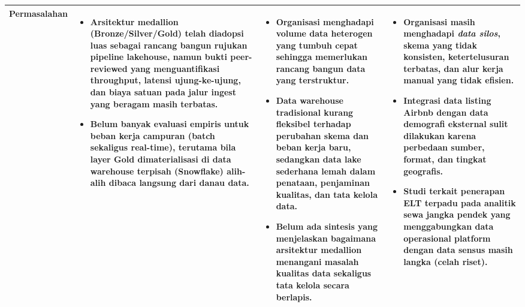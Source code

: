 \documentclass[11pt,a4paper]{article}
\newenvironment{cellitems}
  {\vspace{-2pt}\begin{itemize}\setlength{\itemsep}{1.5pt}\setlength{\parskip}{0pt}\setlength{\topsep}{1pt}}
  {\end{itemize}\vspace{-2pt}}
\begin{document}
\begin{longtable}{|L{2.5cm}|L{7.65cm}|L{7.65cm}|L{7.65cm}|}
\textbf{Permasalahan} &
\begin{cellitems}
  \item Arsitektur medallion (Bronze/Silver/Gold) telah diadopsi luas sebagai rancang bangun rujukan pipeline lakehouse, namun bukti peer-reviewed yang menguantifikasi throughput, latensi ujung-ke-ujung, dan biaya satuan pada jalur ingest yang beragam masih terbatas.
  \item Belum banyak evaluasi empiris untuk beban kerja campuran (batch sekaligus real-time), terutama bila layer Gold dimaterialisasi di data warehouse terpisah (Snowflake) alih-alih dibaca langsung dari danau data.
\end{cellitems} &
\begin{cellitems}
  \item Organisasi menghadapi volume data heterogen yang tumbuh cepat sehingga memerlukan rancang bangun data yang terstruktur.
  \item Data warehouse tradisional kurang fleksibel terhadap perubahan skema dan beban kerja baru, sedangkan data lake sederhana lemah dalam penataan, penjaminan kualitas, dan tata kelola data.
  \item Belum ada sintesis yang menjelaskan bagaimana arsitektur medallion menangani masalah kualitas data sekaligus tata kelola secara berlapis.
\end{cellitems} &
\begin{cellitems}
  \item Organisasi masih menghadapi \textit{data silos}, skema yang tidak konsisten, ketertelusuran terbatas, dan alur kerja manual yang tidak efisien.
  \item Integrasi data listing Airbnb dengan data demografi eksternal sulit dilakukan karena perbedaan sumber, format, dan tingkat geografis.
  \item Studi terkait penerapan ELT terpadu pada analitik sewa jangka pendek yang menggabungkan data operasional platform dengan data sensus masih langka (celah riset).
\end{cellitems} \\
\hline


\end{longtable}
\end{document}
